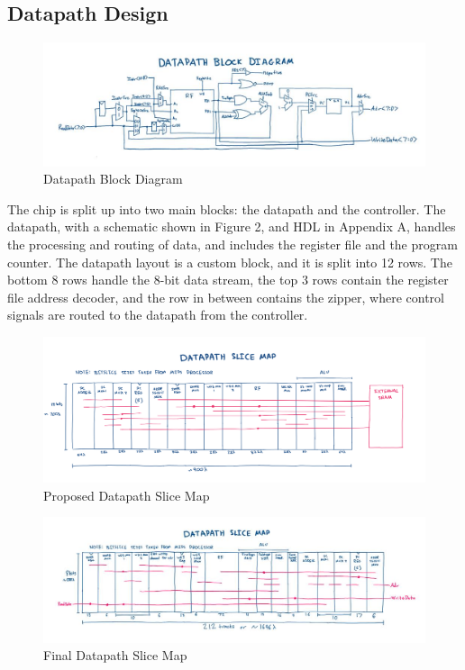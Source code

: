 \documentclass[12pt]{article}
\begin{document}
\subsection{Datapath Design}

\begin{figure}[H]
    \begin{center}
    \includegraphics[width=18cm]{blockdiagram.jpg}
    \caption{Datapath Block Diagram}
    \end{center}
    \label{fig:blockdiagram}
\end{figure}

The chip is split up into two main blocks: the datapath and the controller.  The datapath, with a schematic shown in Figure 2, and HDL in Appendix A, handles the processing and routing of data, and includes the register file and the program counter.  The datapath layout is a custom block, and it is split into 12 rows.  The bottom 8 rows handle the 8-bit data stream, the top 3 rows contain the register file address decoder, and the row in between contains the zipper, where control signals are routed to the datapath from the controller.

\begin{figure}[H]
    \begin{center}
    \includegraphics[width=18cm]{slicemap_old}
    \end{center}
    \caption{Proposed Datapath Slice Map}
    \label{fig:sliceplan}
\end{figure}

\begin{figure}[H]
    \begin{center}
    \includegraphics[width=18cm]{slicemap.jpg}
    \end{center}
    \caption{Final Datapath Slice Map}
    \label{fig:sliceplan}
\end{figure}
\end{document}
